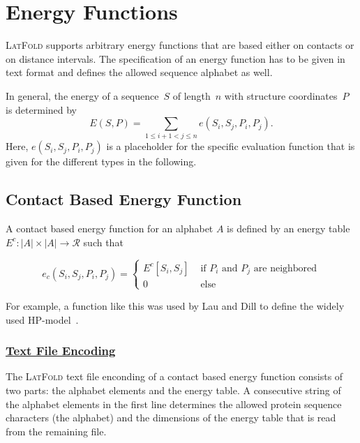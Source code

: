 \documentclass{article}
\newcommand{\latfold}{\textsc{LatFold}}
\begin{document}
\section{Energy Functions}
\label{sec:energy}

\latfold{} supports arbitrary energy functions that are based either on contacts
or on distance intervals. The specification of an energy function has to be
given in text format and defines the allowed sequence alphabet as well.

In general, the energy of a sequence~$S$ of length~$n$ with structure
coordinates~$P$ is determined by
\begin{equation}
	E(S,P) = \sum_{1\leq i+1<j\leq n} e(S_i, S_j, P_i, P_j).
\end{equation}
Here, $e(S_i, S_j, P_i, P_j)$ is a placeholder for the specific evaluation
function that is given for the different types in the following.

\subsection{Contact Based Energy Function}
\label{sec:energy:contact}

A contact based energy function for an alphabet $A$ is defined by an energy
table $E^c : |A|\times|A| \rightarrow \mathcal{R}$ such that 

\begin{equation}
	e_c(S_i, S_j, P_i, P_j) = 
	\left\{
	\begin{array}{ll}
    	E^c[S_i,S_j] & \mbox{ if $P_i$ and $P_j$ are neighbored} \\
    	0 & \mbox{ else }
    \end{array} \right.
\end{equation}

For example, a function like this was used by Lau and Dill to define the widely
used HP-model~\cite{Lau_Dill:89a}.

\subsubsection*{\underline{ Text File Encoding }}

The \latfold{} text file enconding of a contact based energy function consists of
two parts: the alphabet elements and the energy table. A consecutive string of
the alphabet elements in the first line determines the allowed protein sequence
characters (the alphabet) and the dimensions of the energy table that is read
from the remaining file.
\end{document}
